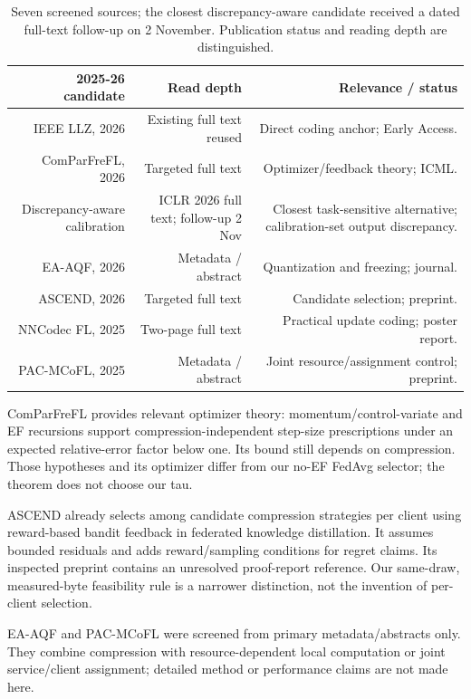 \begin{table}[htbp]
\centering
\small
\begin{tabularx}{\textwidth}{R{1.17000}R{0.72000}R{1.11000}}
\toprule
\textbf{2025-26 candidate} & \textbf{Read depth} & \textbf{Relevance / status} \\\midrule
IEEE LLZ, 2026 & Existing full text reused & Direct coding anchor; Early Access. \\
ComParFreFL, 2026 & Targeted full text & Optimizer/feedback theory; ICML. \\
Discrepancy-aware calibration & ICLR 2026 full text; follow-up 2 Nov & Closest task-sensitive alternative; calibration-set output discrepancy. \parencite{wang2026discrepancy} \\
EA-AQF, 2026 & Metadata / abstract & Quantization and freezing; journal. \\
ASCEND, 2026 & Targeted full text & Candidate selection; preprint. \\
NNCodec FL, 2025 & Two-page full text & Practical update coding; poster report. \\
PAC-MCoFL, 2025 & Metadata / abstract & Joint resource/assignment control; preprint. \\
\bottomrule
\end{tabularx}
\caption{Seven screened sources; the closest discrepancy-aware candidate received a dated full-text follow-up on 2 November. Publication status and reading depth are distinguished.}
\label{tab:recent}
\end{table}

ComParFreFL provides relevant optimizer theory: momentum/control-variate and EF recursions support compression-independent step-size prescriptions under an expected relative-error factor below one. Its bound still depends on compression. Those hypotheses and its optimizer differ from our no-EF FedAvg selector; the theorem does not choose our tau. \parencite{yan2026robustcompression}

ASCEND already selects among candidate compression strategies per client using reward-based bandit feedback in federated knowledge distillation. It assumes bounded residuals and adds reward/sampling conditions for regret claims. Its inspected preprint contains an unresolved proof-report reference. Our same-draw, measured-byte feasibility rule is a narrower distinction, not the invention of per-client selection. \parencite{liu2026ascend}

EA-AQF and PAC-MCoFL were screened from primary metadata/abstracts only. They combine compression with resource-dependent local computation or joint service/client assignment; detailed method or performance claims are not made here. \parencite{ikram2026eaaqf,tan2025pacmcofl}

